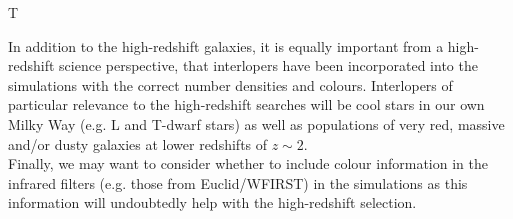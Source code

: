 \begin{tasklist}{T}
\begin{task}
{In addition to the high-redshift galaxies, it is equally important from a high-redshift science perspective, that interlopers have been incorporated into the simulations with the correct number densities and colours. Interlopers of particular relevance to the high-redshift searches will be cool stars in our own Milky Way (e.g. L and T-dwarf stars) as well as populations of very red, massive and/or dusty galaxies at lower redshifts of $z\sim2$.
\\
Finally, we may want to consider whether to include colour information in the infrared filters (e.g. those from Euclid/WFIRST) in the simulations as this information will undoubtedly help with the high-redshift selection.
 }
\end{task}
\end{tasklist}
